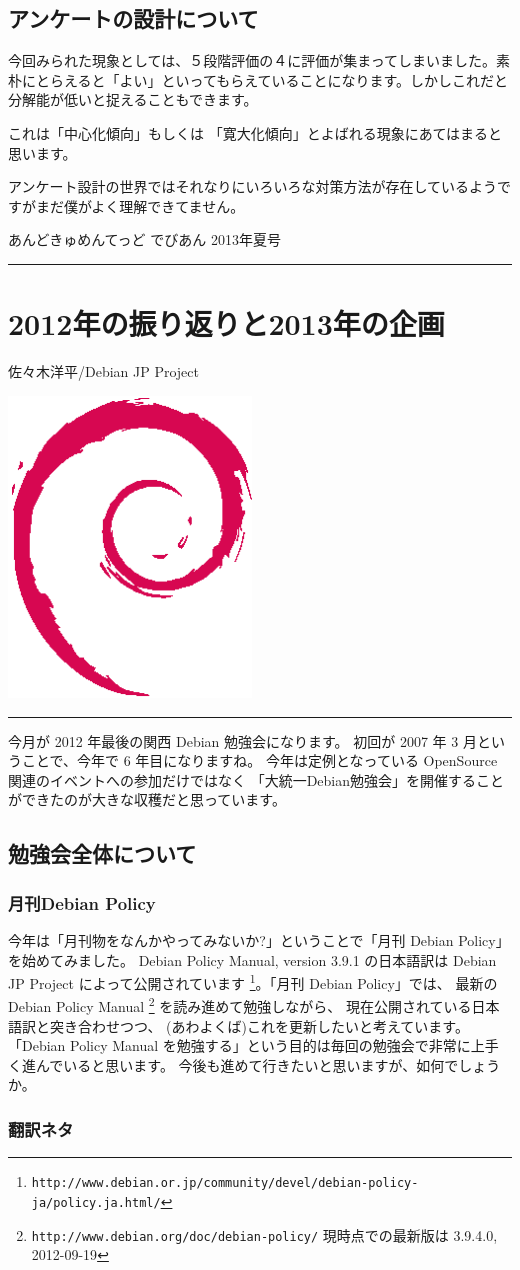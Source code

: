 \documentclass[mingoth,a4paper]{jsarticle}
\renewcommand{\dancersection}[2]{%
\newpage
あんどきゅめんてっど でびあん 2013年夏号
%
\vspace{0.1mm}\\
{\color{dancerdarkblue}\rule{\hsize}{2mm}}

%
%
\begin{minipage}[t]{0.6\hsize}
\color{dancerdarkblue}
\vspace{1cm}
\section{#1}
\hfill{}#2\\
\end{minipage}
\begin{minipage}[t]{0.4\hsize}
\vspace{-2cm}
\hfill{}\includegraphics[height=8cm]{image200502/openlogo-nd.eps}\\
\vspace{-5cm}
\end{minipage}
%
{\color{dancerlightblue}\rule{0.66\hsize}{2mm}}
%
\vspace{2cm}
}
\begin{document}
\subsection{アンケートの設計について}

今回みられた現象としては、５段階評価の４に評価が集まってしまいました。素
朴にとらえると「よい」といってもらえていることになります。しかしこれだと
分解能が低いと捉えることもできます。

これは「中心化傾向」もしくは
「寛大化傾向」とよばれる現象にあてはまると思います。

アンケート設計の世界ではそれなりにいろいろな対策方法が存在しているようで
すがまだ僕がよく理解できてません。

\clearpage %

\dancersection{2012年の振り返りと2013年の企画}{佐々木洋平/Debian JP Project}

今月が 2012 年最後の関西 Debian 勉強会になります。
初回が 2007 年 3 月ということで、今年で 6 年目になりますね。
今年は定例となっている OpenSource 関連のイベントへの参加だけではなく
「大統一Debian勉強会」を開催することができたのが大きな収穫だと思っています。

\subsection{勉強会全体について}

\subsubsection{月刊Debian Policy}
今年は「月刊物をなんかやってみないか?」ということで「月刊 Debian Policy」を始めてみました。
Debian Policy Manual, version 3.9.1 の日本語訳は Debian JP Project によって公開されています
\footnote{
  \texttt{http://www.debian.or.jp/community/devel/debian-policy-ja/policy.ja.html/}
}。「月刊 Debian Policy」では、
最新の Debian Policy Manual
\footnote{
  \texttt{http://www.debian.org/doc/debian-policy/}\newline
  現時点での最新版は 3.9.4.0, 2012-09-19
} を読み進めて勉強しながら、
現在公開されている日本語訳と突き合わせつつ、
(あわよくば)これを更新したいと考えています。
「Debian Policy Manual を勉強する」という目的は毎回の勉強会で非常に上手く進んでいると思います。
今後も進めて行きたいと思いますが、如何でしょうか。

\subsubsection{翻訳ネタ}
\end{document}
